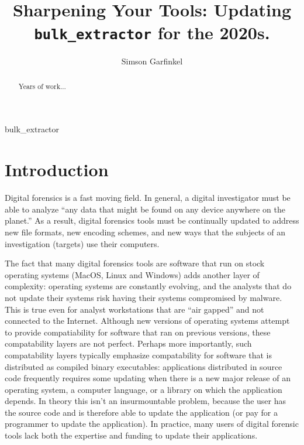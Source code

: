 \documentclass[5p]{elsarticle}
\begin{document}
\begin{frontmatter}

\title{Sharpening Your Tools: Updating {\tt bulk\_extractor} for the 2020s.}

\author{Simson Garfinkel}
\address{Arlington, VA}


\begin{abstract}
Years of work...
\end{abstract}

\begin{keyword}
bulk\_extractor
\end{keyword}

\end{frontmatter}

\linenumbers

\section{Introduction}
Digital forensics is a fast moving field. In general, a digital
investigator must be able to analyze ``any data that might be found on
any device anywhere on the planet.''\cite{article} As a result,
digital forensics tools must be continually updated to address new
file formats, new encoding schemes, and new ways that the subjects of
an investigation (targets) use their computers.

The fact that many digital forensics tools are software that run on
stock operating systems (MacOS, Linux and Windows) adds another layer
of complexity: operating systems are constantly evolving, and the
analysts that do not update their systems risk having their systems
compromised by malware. This is true even for analyst workstations
that are ``air gapped'' and not connected to the Internet. Although
new versions of operating systems attempt to provide
compatiability for software that ran on previous versions, these
compatability layers are not perfect. Perhaps more importantly, such
compatability layers typically emphasize compatability for software
that is distributed as compiled binary executables: applications
distributed in source code frequently requires some updating when
there is a new major release of an operating system, a computer
language, or a library on which the application depends. In theory
this isn't an insurmountable problem, because the user has the source
code and is therefore able to update the application (or pay for a
programmer to update the application). In practice, many users of
digital forensic tools lack both the expertise and funding to update
their applications.
\end{document}
